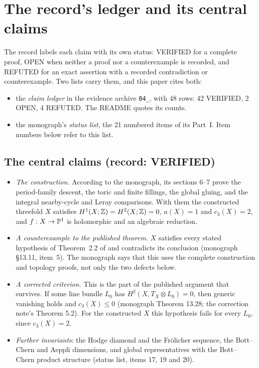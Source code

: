 \section{The record's ledger and its central claims}\label{sec:ledger}

The record labels each claim with its own status: \textsf{VERIFIED} for a complete proof, \textsf{OPEN} when neither a proof nor a counterexample is recorded, and \textsf{REFUTED} for an exact assertion with a recorded contradiction or counterexample. Two lists carry them, and this paper cites both:
\begin{itemize}
\item the \emph{claim ledger} in the evidence archive \texttt{04\_}, with 48 rows: 42 \textsf{VERIFIED}, 2 \textsf{OPEN}, 4 \textsf{REFUTED}. The README quotes its counts.
\item the monograph's \emph{status list}, the 21 numbered items of its Part~I. Item numbers below refer to this list.
\end{itemize}

\subsection{The central claims (record: \textsf{VERIFIED})}

\begin{itemize}
\item \emph{The construction.} According to the monograph, its sections 6--7 prove the period-family descent, the toric and finite fillings, the global gluing, and the integral nearby-cycle and Leray comparisons. With them the constructed threefold $X$ satisfies $H^1(X;\mathbb{Z})=H^2(X;\mathbb{Z})=0$, $a(X)=1$ and $c_3(X)=2$, and $f:X\to\mathbb{P}^1$ is holomorphic and an algebraic reduction.
\item \emph{A counterexample to the published theorem.} $X$ satisfies every stated hypothesis of Theorem~2.2 of \cite{CDP20} and contradicts its conclusion (monograph §13.11, item~5). The monograph says that this uses the complete construction and topology proofs, not only the two defects below.
\item \emph{A corrected criterion.} This is the part of the published argument that survives. If some line bundle $L_0$ has $H^2(X,T_X\otimes L_0)=0$, then generic vanishing holds and $c_3(X)\le0$ (monograph Theorem 13.28; the correction note's Theorem 5.2). For the constructed $X$ this hypothesis fails for every $L_0$, since $c_3(X)=2$.
\item \emph{Further invariants}: the Hodge diamond and the Frölicher sequence, the Bott--Chern and Aeppli dimensions, and global representatives with the Bott--Chern product structure (status list, items 17, 19 and 20).
\end{itemize}

